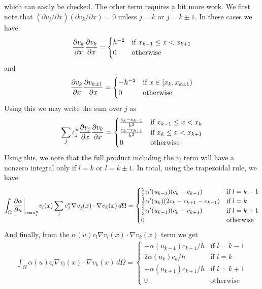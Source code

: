 \documentclass[12pt]{article}
\begin{document}
which can easily be checked. The other term requires a bit more work. We first note that $(\partial v_j/ \partial x) (\partial v_k/ \partial x) = 0$ unless $j = k$ or $j = k \pm 1$. In these cases we have 
\begin{align}
{\partial v_k \over \partial x} {\partial v_k \over \partial x} = \begin{cases} h^{-2} & \text{if } x_{k-1} \le x < x_{k+1}  \\ 0 & \text{otherwise}\end{cases}
\end{align}
and
\begin{align}
 {\partial v_k \over \partial x} {\partial v_{k\pm1} \over \partial x} = \begin{cases} -h^{-2} & \text{if } x\in[x_k, x_{k\pm 1})  \\ 0 & \text{otherwise}\end{cases}
\end{align}
Using this we may write the sum over $j$ as 
\begin{align}
 \sum_j c_j^n {\partial v_j \over \partial x}{\partial v_k \over \partial x} = \begin{cases} {c_{k}-c_{k-1} \over h^2} & \text{if } x_{k-1} \le x < x_k \\ {c_{k}-c_{k+1} \over h^2} & \text{if } x_{k} \le x < x_{k+1} \\ 0 & \text{otherwise}  \end{cases}
\end{align}
Using this, we note that the full product including the $v_l$ term will have a nonzero integral only if $l = k$ or $l = k\pm 1$. In total, using the trapezoidal rule, we have
\begin{align}
 \int_\Omega {\partial \alpha \over \partial u} \bigg|_{u = u^{n}_i} v_l(x)\sum_j c_j^n \nabla v_j(x)\cdot \nabla v_k(x)\, d\Omega = \begin{cases} \frac{2}{3}\alpha'(u_{k-1})(c_k - c_{k-1}) & \text{if } l=k-1 \\ \frac{1}{3}\alpha'(u_{k})(2c_k - c_{k+1}- c_{k-1}) & \text{if } l=k \\ \frac{2}{3}\alpha'(u_{k-1})(c_k - c_{k+1}) & \text{if } l=k+1 \\ 0 & \text{otherwise} \end{cases}
\end{align}
And finally, from the $\alpha(u) c_l \nabla v_l(x) \cdot \nabla v_k(x)$ term we get 
\begin{align}
 \int_\Omega \alpha(u) c_l \nabla v_l(x) \cdot \nabla v_k(x) \, d\Omega = \begin{cases} -\alpha(u_{k-1})c_{k-1}/h & \text{if } l = k-1 \\ 2\alpha(u_{k})c_{k}/h & \text{if } l = k \\ -\alpha(u_{k+1})c_{k+1}/h & \text{if } l = k+1 \\ 0 & \text{otherwise} \end{cases}
\end{align}
\end{document}
